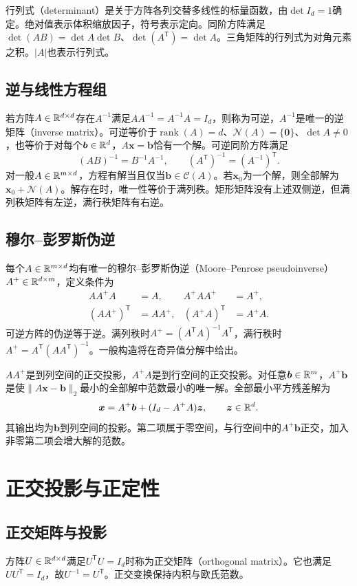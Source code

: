 行列式（determinant）是关于方阵各列交替多线性的标量函数，由$\det I_d=1$确定。绝对值表示体积缩放因子，符号表示定向。同阶方阵满足$\det(AB)=\det A\det B$、$\det(A^{\mathsf T})=\det A$。三角矩阵的行列式为对角元素之积。$|A|$也表示行列式。

\subsection{逆与线性方程组}
若方阵$A\in\mathbb{R}^{d\times d}$存在$A^{-1}$满足$AA^{-1}=A^{-1}A=I_d$，则称为可逆，$A^{-1}$是唯一的逆矩阵（inverse matrix）。可逆等价于$\operatorname{rank}(A)=d$、$\mathcal N(A)=\{\bm0\}$、$\det A\ne0$，也等价于对每个$\bm b\in\mathbb{R}^d$，$A\bm x=\bm b$恰有一个解。可逆同阶方阵满足
\begin{equation}
 (AB)^{-1}=B^{-1}A^{-1},\qquad (A^{\mathsf T})^{-1}=(A^{-1})^{\mathsf T}.
\end{equation}
对一般$A\in\mathbb{R}^{m\times d}$，方程有解当且仅当$\bm b\in\mathcal C(A)$。若$\bm x_0$为一个解，则全部解为$\bm x_0+\mathcal N(A)$。解存在时，唯一性等价于满列秩。矩形矩阵没有上述双侧逆，但满列秩矩阵有左逆，满行秩矩阵有右逆。

\subsection{穆尔--彭罗斯伪逆}
每个$A\in\mathbb{R}^{m\times d}$均有唯一的穆尔--彭罗斯伪逆（Moore--Penrose pseudoinverse）$A^+\in\mathbb{R}^{d\times m}$，定义条件为
\begin{align}
 AA^+A&=A,&A^+AA^+&=A^+,\\
 (AA^+)^{\mathsf T}&=AA^+,&(A^+A)^{\mathsf T}&=A^+A.
\end{align}
可逆方阵的伪逆等于逆。满列秩时$A^+=(A^{\mathsf T}A)^{-1}A^{\mathsf T}$，满行秩时$A^+=A^{\mathsf T}(AA^{\mathsf T})^{-1}$。一般构造将在奇异值分解中给出。

$AA^+$是到列空间的正交投影，$A^+A$是到行空间的正交投影。对任意$\bm b\in\mathbb{R}^m$，$A^+\bm b$是使$\|A\bm x-\bm b\|_2$最小的全部解中范数最小的唯一解。全部最小平方残差解为
\begin{equation}
 \bm x=A^+\bm b+(I_d-A^+A)\bm z,\qquad\bm z\in\mathbb{R}^d.
\end{equation}
其输出均为$\bm b$到列空间的投影。第二项属于零空间，与行空间中的$A^+\bm b$正交，加入非零第二项会增大解的范数。

\section{正交投影与正定性}
\subsection{正交矩阵与投影}
方阵$U\in\mathbb{R}^{d\times d}$满足$U^{\mathsf T}U=I_d$时称为正交矩阵（orthogonal matrix）。它也满足$UU^{\mathsf T}=I_d$，故$U^{-1}=U^{\mathsf T}$。正交变换保持内积与欧氏范数。

